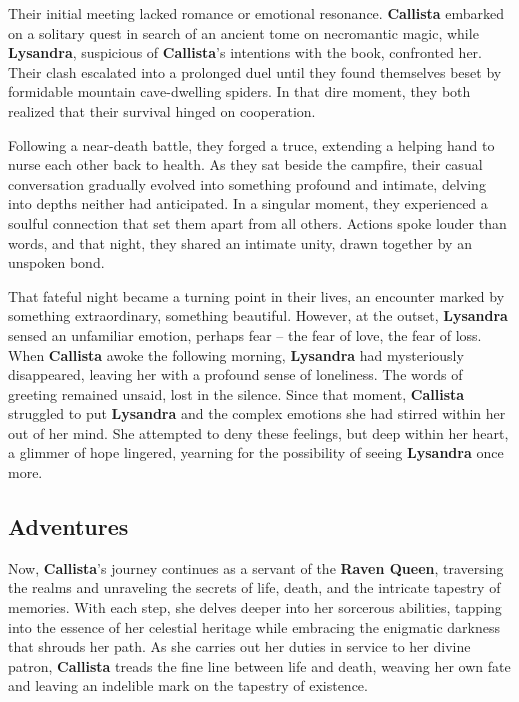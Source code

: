 \documentclass{article}
\begin{document}
Their initial meeting lacked romance or emotional resonance. \textbf{Callista} embarked on a solitary quest in search of an ancient tome on necromantic magic, while \textbf{Lysandra}, suspicious of \textbf{Callista}'s intentions with the book, confronted her. Their clash escalated into a prolonged duel until they found themselves beset by formidable mountain cave-dwelling spiders. In that dire moment, they both realized that their survival hinged on cooperation.

Following a near-death battle, they forged a truce, extending a helping hand to nurse each other back to health. As they sat beside the campfire, their casual conversation gradually evolved into something profound and intimate, delving into depths neither had anticipated. In a singular moment, they experienced a soulful connection that set them apart from all others. Actions spoke louder than words, and that night, they shared an intimate unity, drawn together by an unspoken bond.

That fateful night became a turning point in their lives, an encounter marked by something extraordinary, something beautiful. However, at the outset, \textbf{Lysandra} sensed an unfamiliar emotion, perhaps fear – the fear of love, the fear of loss. When \textbf{Callista} awoke the following morning, \textbf{Lysandra} had mysteriously disappeared, leaving her with a profound sense of loneliness. The words of greeting remained unsaid, lost in the silence. Since that moment, \textbf{Callista} struggled to put \textbf{Lysandra} and the complex emotions she had stirred within her out of her mind. She attempted to deny these feelings, but deep within her heart, a glimmer of hope lingered, yearning for the possibility of seeing \textbf{Lysandra} once more.

\subsection{Adventures}

Now, \textbf{Callista}'s journey continues as a servant of the \textbf{Raven Queen}, traversing the realms and unraveling the secrets of life, death, and the intricate tapestry of memories. With each step, she delves deeper into her sorcerous abilities, tapping into the essence of her celestial heritage while embracing the enigmatic darkness that shrouds her path. As she carries out her duties in service to her divine patron, \textbf{Callista} treads the fine line between life and death, weaving her own fate and leaving an indelible mark on the tapestry of existence.
\end{document}
